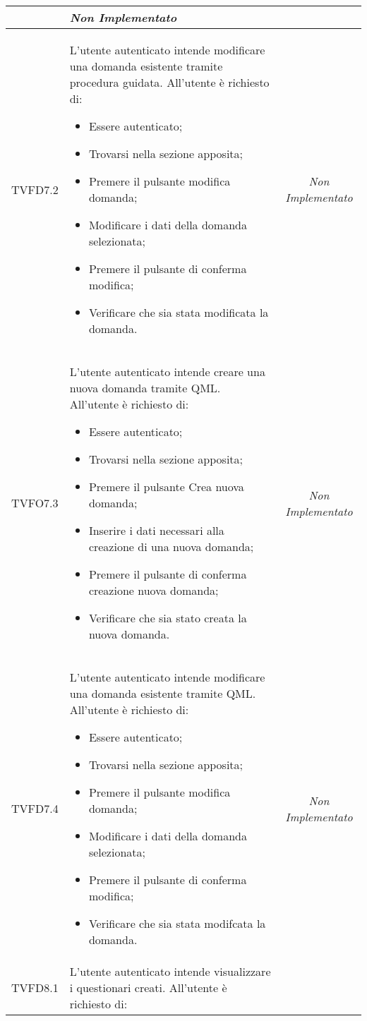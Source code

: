 \begin{longtable}[ht]{|c|>{}m{8cm}|c|}
 & \textit{Non Implementato}\\ \hline
\hypertarget{TVFD7.2}{TVFD7.2} & L’utente autenticato intende modificare una
domanda esistente tramite procedura guidata. All’utente è richiesto di:
\begin{itemize}
\item Essere autenticato;
\item Trovarsi nella sezione apposita;
\item Premere il pulsante  modifica domanda;
\item Modificare i dati della domanda selezionata;
\item Premere il pulsante di conferma modifica;
\item Verificare che sia stata modificata la domanda.
\end{itemize}
 & \textit{Non Implementato}\\ \hline
\hypertarget{TVFO7.3}{TVFO7.3} & L’utente autenticato intende creare una nuova
domanda tramite QML. All’utente è richiesto di:
\begin{itemize}
\item Essere autenticato;
\item Trovarsi nella sezione apposita;
\item Premere il pulsante Crea nuova domanda;
\item Inserire i dati necessari alla creazione di una nuova domanda;
\item Premere il pulsante di conferma creazione
nuova domanda;
\item Verificare che sia stato creata la nuova domanda.
\end{itemize}
 & \textit{Non Implementato}\\ \hline
\hypertarget{TVFD7.4}{TVFD7.4} & L’utente autenticato intende modificare una
domanda esistente tramite QML. All’utente è richiesto di:
\begin{itemize}
\item Essere autenticato;
\item Trovarsi nella sezione apposita;
\item Premere il pulsante  modifica domanda;
\item Modificare i dati della domanda selezionata;
\item Premere il pulsante di conferma modifica;
\item Verificare che sia stata modifcata la domanda.
\end{itemize}
 & \textit{Non Implementato}\\ \hline
\hypertarget{TVFD8.1}{TVFD8.1} & L’utente autenticato intende visualizzare i questionari creati. All’utente è richiesto di:

\end{longtable}
